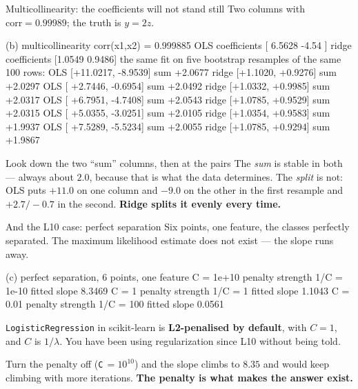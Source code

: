 \documentclass[aspectratio=169]{beamer}
\begin{document}
\begin{frame}[fragile,shrink=8]{Multicollinearity: the coefficients will not stand still}
Two columns with $\mathrm{corr} = 0.99989$; the truth is $y = 2z$.
\begin{outblk}
(b) multicollinearity  corr(x1,x2) = 0.999885
    OLS   coefficients [ 6.5628 -4.54  ]
    ridge coefficients [1.0549 0.9486]
    the same fit on five bootstrap resamples of the same 100 rows:
       OLS [+11.0217,  -8.9539]   sum +2.0677      ridge [+1.1020, +0.9276]   sum +2.0297
       OLS [ +2.7446,  -0.6954]   sum +2.0492      ridge [+1.0332, +0.9985]   sum +2.0317
       OLS [ +6.7951,  -4.7408]   sum +2.0543      ridge [+1.0785, +0.9529]   sum +2.0315
       OLS [ +5.0355,  -3.0251]   sum +2.0105      ridge [+1.0354, +0.9583]   sum +1.9937
       OLS [ +7.5289,  -5.5234]   sum +2.0055      ridge [+1.0785, +0.9294]   sum +1.9867
\end{outblk}
\begin{alertblock}{Look down the two ``sum'' columns, then at the pairs}
  \footnotesize The \emph{sum} is stable in both --- always about $2.0$,
  because that is what the data determines. The \emph{split} is not: OLS puts
  $+11.0$ on one column and $-9.0$ on the other in the first resample and
  $+2.7 / -0.7$ in the second. \textbf{Ridge splits it evenly every time.}
\end{alertblock}
\end{frame}

\begin{frame}[fragile,shrink=6]{And the L10 case: perfect separation}
Six points, one feature, the classes perfectly separated. The maximum
likelihood estimate does not exist --- the slope runs away.
\begin{outblk}
(c) perfect separation, 6 points, one feature
    C = 1e+10     penalty strength 1/C = 1e-10     fitted slope     8.3469
    C = 1         penalty strength 1/C = 1         fitted slope     1.1043
    C = 0.01      penalty strength 1/C = 100       fitted slope     0.0561
\end{outblk}
\begin{center}\small
  \texttt{LogisticRegression} in scikit-learn is \textbf{L2-penalised by
  default}, with $C = 1$, and $C$ is $1/\lambda$. You have been using
  regularization since L10 without being told.
\end{center}
\begin{center}\small
  Turn the penalty off (\texttt{C}$\,=10^{10}$) and the slope climbs to $8.35$
  and would keep climbing with more iterations. \textbf{The penalty is what
  makes the answer exist.}
\end{center}
\end{frame}
\end{document}
